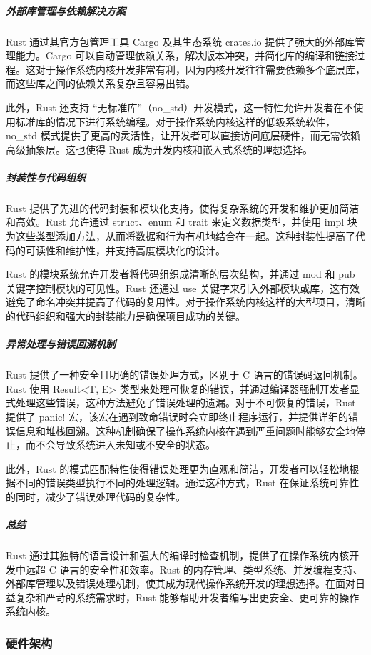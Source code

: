 \subparagraph{外部库管理与依赖解决方案}

Rust 通过其官方包管理工具 Cargo 及其生态系统 crates.io 提供了强大的外部库管理能力。Cargo 可以自动管理依赖关系，解决版本冲突，并简化库的编译和链接过程。这对于操作系统内核开发非常有利，因为内核开发往往需要依赖多个底层库，而这些库之间的依赖关系复杂且容易出错。

此外，Rust 还支持 “无标准库”（no\_std）开发模式，这一特性允许开发者在不使用标准库的情况下进行系统编程。对于操作系统内核这样的低级系统软件，no\_std 模式提供了更高的灵活性，让开发者可以直接访问底层硬件，而无需依赖高级抽象层。这也使得 Rust 成为开发内核和嵌入式系统的理想选择。

\subparagraph{封装性与代码组织}

Rust 提供了先进的代码封装和模块化支持，使得复杂系统的开发和维护更加简洁和高效。Rust 允许通过 struct、enum 和 trait 来定义数据类型，并使用 impl 块为这些类型添加方法，从而将数据和行为有机地结合在一起。这种封装性提高了代码的可读性和维护性，并支持高度模块化的设计。

Rust 的模块系统允许开发者将代码组织成清晰的层次结构，并通过 mod 和 pub 关键字控制模块的可见性。Rust 还通过 use 关键字来引入外部模块或库，这有效避免了命名冲突并提高了代码的复用性。对于操作系统内核这样的大型项目，清晰的代码组织和强大的封装能力是确保项目成功的关键。

\subparagraph{异常处理与错误回溯机制}

Rust 提供了一种安全且明确的错误处理方式，区别于 C 语言的错误码返回机制。Rust 使用 Result<T, E> 类型来处理可恢复的错误，并通过编译器强制开发者显式处理这些错误，这种方法避免了错误处理的遗漏。对于不可恢复的错误，Rust 提供了 panic! 宏，该宏在遇到致命错误时会立即终止程序运行，并提供详细的错误信息和堆栈回溯。这种机制确保了操作系统内核在遇到严重问题时能够安全地停止，而不会导致系统进入未知或不安全的状态。

此外，Rust 的模式匹配特性使得错误处理更为直观和简洁，开发者可以轻松地根据不同的错误类型执行不同的处理逻辑。通过这种方式，Rust 在保证系统可靠性的同时，减少了错误处理代码的复杂性。

\subparagraph{总结}

Rust 通过其独特的语言设计和强大的编译时检查机制，提供了在操作系统内核开发中远超 C 语言的安全性和效率。Rust 的内存管理、类型系统、并发编程支持、外部库管理以及错误处理机制，使其成为现代操作系统开发的理想选择。在面对日益复杂和严苛的系统需求时，Rust 能够帮助开发者编写出更安全、更可靠的操作系统内核。

\subsubsection{硬件架构}

